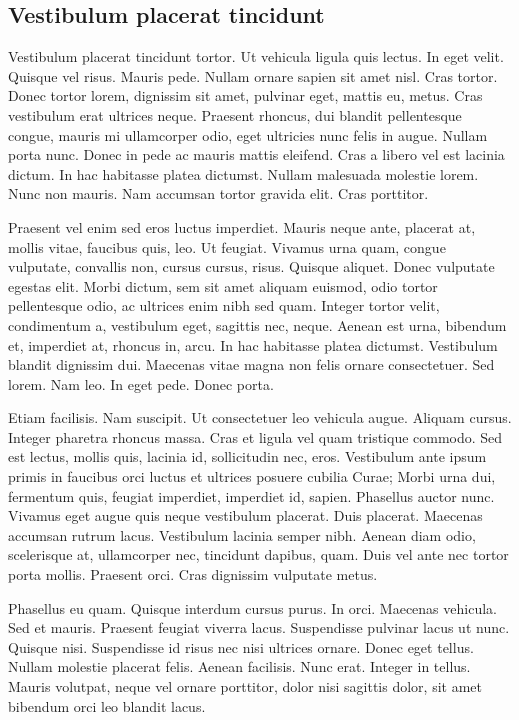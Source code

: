 \documentclass[../hdr.tex]{subfiles}
\begin{document}
\subsection{Vestibulum placerat tincidunt}

Vestibulum placerat tincidunt tortor. Ut vehicula ligula quis lectus. In eget
velit. Quisque vel risus. Mauris pede. Nullam ornare sapien sit amet nisl. Cras
tortor. Donec tortor lorem, dignissim sit amet, pulvinar eget, mattis eu, metus.
Cras vestibulum erat ultrices neque. Praesent rhoncus, dui blandit pellentesque
congue, mauris mi ullamcorper odio, eget ultricies nunc felis in augue. Nullam
porta nunc. Donec in pede ac mauris mattis eleifend. Cras a libero vel est
lacinia dictum. In hac habitasse platea dictumst. Nullam malesuada molestie
lorem. Nunc non mauris. Nam accumsan tortor gravida elit. Cras porttitor.

Praesent vel enim sed eros luctus imperdiet. Mauris neque ante, placerat at,
mollis vitae, faucibus quis, leo. Ut feugiat. Vivamus urna quam, congue
vulputate, convallis non, cursus cursus, risus. Quisque aliquet. Donec vulputate
egestas elit. Morbi dictum, sem sit amet aliquam euismod, odio tortor
pellentesque odio, ac ultrices enim nibh sed quam. Integer tortor velit,
condimentum a, vestibulum eget, sagittis nec, neque. Aenean est urna, bibendum
et, imperdiet at, rhoncus in, arcu. In hac habitasse platea dictumst. Vestibulum
blandit dignissim dui. Maecenas vitae magna non felis ornare consectetuer. Sed
lorem. Nam leo. In eget pede. Donec porta.

Etiam facilisis. Nam suscipit. Ut consectetuer leo vehicula augue. Aliquam
cursus. Integer pharetra rhoncus massa. Cras et ligula vel quam tristique
commodo. Sed est lectus, mollis quis, lacinia id, sollicitudin nec, eros.
Vestibulum ante ipsum primis in faucibus orci luctus et ultrices posuere cubilia
Curae; Morbi urna dui, fermentum quis, feugiat imperdiet, imperdiet id, sapien.
Phasellus auctor nunc. Vivamus eget augue quis neque vestibulum placerat. Duis
placerat. Maecenas accumsan rutrum lacus. Vestibulum lacinia semper nibh. Aenean
diam odio, scelerisque at, ullamcorper nec, tincidunt dapibus, quam. Duis vel
ante nec tortor porta mollis. Praesent orci. Cras dignissim vulputate metus.

Phasellus eu quam. Quisque interdum cursus purus. In orci. Maecenas vehicula.
Sed et mauris. Praesent feugiat viverra lacus. Suspendisse pulvinar lacus ut
nunc. Quisque nisi. Suspendisse id risus nec nisi ultrices ornare. Donec eget
tellus. Nullam molestie placerat felis. Aenean facilisis. Nunc erat. Integer in
tellus. Mauris volutpat, neque vel ornare porttitor, dolor nisi sagittis dolor,
sit amet bibendum orci leo blandit lacus.
\end{document}
